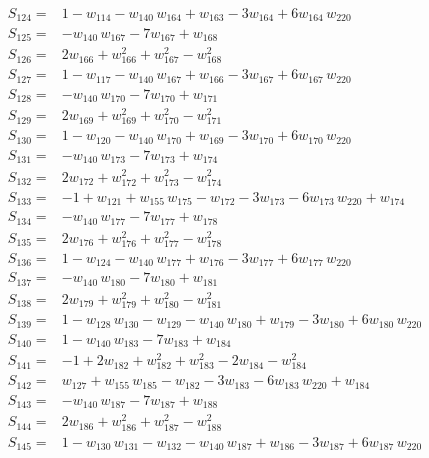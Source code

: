 \begin{align*}
S_{124}={}& 1 - w_{114} - w_{140}\,w_{164} + w_{163} - 3w_{164} + 6w_{164}\,w_{220} \\[2pt]
S_{125}={}& -w_{140}\,w_{167} - 7w_{167} + w_{168} \\[2pt]
S_{126}={}& 2w_{166} + w_{166}^{2} + w_{167}^{2} - w_{168}^{2} \\[2pt]
S_{127}={}& 1 - w_{117} - w_{140}\,w_{167} + w_{166} - 3w_{167} + 6w_{167}\,w_{220} \\[2pt]
S_{128}={}& -w_{140}\,w_{170} - 7w_{170} + w_{171} \\[2pt]
S_{129}={}& 2w_{169} + w_{169}^{2} + w_{170}^{2} - w_{171}^{2} \\[2pt]
S_{130}={}& 1 - w_{120} - w_{140}\,w_{170} + w_{169} - 3w_{170} + 6w_{170}\,w_{220} \\[2pt]
S_{131}={}& -w_{140}\,w_{173} - 7w_{173} + w_{174} \\[2pt]
S_{132}={}& 2w_{172} + w_{172}^{2} + w_{173}^{2} - w_{174}^{2} \\[2pt]
S_{133}={}& -1 + w_{121} + w_{155}\,w_{175} - w_{172} - 3w_{173} - 6w_{173}\,w_{220} + w_{174} \\[2pt]
S_{134}={}& -w_{140}\,w_{177} - 7w_{177} + w_{178} \\[2pt]
S_{135}={}& 2w_{176} + w_{176}^{2} + w_{177}^{2} - w_{178}^{2} \\[2pt]
S_{136}={}& 1 - w_{124} - w_{140}\,w_{177} + w_{176} - 3w_{177} + 6w_{177}\,w_{220} \\[2pt]
S_{137}={}& -w_{140}\,w_{180} - 7w_{180} + w_{181} \\[2pt]
S_{138}={}& 2w_{179} + w_{179}^{2} + w_{180}^{2} - w_{181}^{2} \\[2pt]
S_{139}={}& 1 - w_{128}\,w_{130} - w_{129} - w_{140}\,w_{180} + w_{179} - 3w_{180} + 6w_{180}\,w_{220} \\[2pt]
S_{140}={}& 1 - w_{140}\,w_{183} - 7w_{183} + w_{184} \\[2pt]
S_{141}={}& -1 + 2w_{182} + w_{182}^{2} + w_{183}^{2} - 2w_{184} - w_{184}^{2} \\[2pt]
S_{142}={}& w_{127} + w_{155}\,w_{185} - w_{182} - 3w_{183} - 6w_{183}\,w_{220} + w_{184} \\[2pt]
S_{143}={}& -w_{140}\,w_{187} - 7w_{187} + w_{188} \\[2pt]
S_{144}={}& 2w_{186} + w_{186}^{2} + w_{187}^{2} - w_{188}^{2} \\[2pt]
S_{145}={}& 1 - w_{130}\,w_{131} - w_{132} - w_{140}\,w_{187} + w_{186} - 3w_{187} + 6w_{187}\,w_{220} \\[2pt]

\end{align*}
